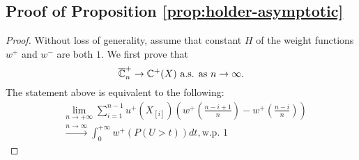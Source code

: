 \subsection*{Proof of Proposition \ref{prop:holder-asymptotic}}

\begin{proof}
Without loss of generality, assume that \holder constant $H$ of the weight functions $w^+$ and $w^-$ are both  $1$.
We first prove  that 
$$\overline {\mathbb{C}}^{+}_n
\rightarrow
\mathbb{C}^{+}(X)
 \text{   a.s. as } n\rightarrow \infty.$$
The statement above is equivalent to the following: 
\begin{align}
&\lim_{n\rightarrow +\infty} \sum_{i=1}^{n-1} u^+\left(X_{[i]}\right) \left(w^+\left(\frac{n-i+1}{n}\right)- w^+\left(\frac{n-i}{n}\right)\right)\\
&\xrightarrow{n \rightarrow\infty} \int_0^{+\infty} w^+\left(P\left(U>t\right)\right) dt , \text{w.p. } 1
\label{eq:claim11}
\end{align}



\end{proof}
